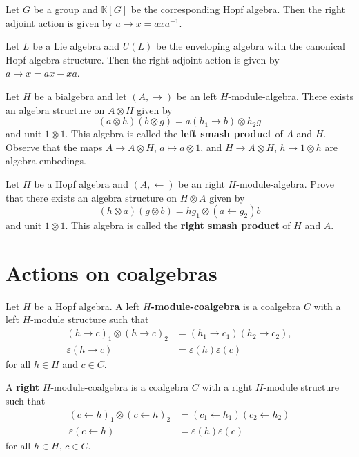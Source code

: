 Let $G$ be a group and $\mathbb{K}[G]$ be the corresponding Hopf algebra. Then
the right adjoint action is given by $a\rightarrow x=axa^{-1}$.

\begin{example}
Let $L$ be a Lie algebra and $U(L)$ be the enveloping algebra with
the canonical Hopf algebra structure. Then the right adjoint action
is given by $a\rightarrow x=ax-xa$.
\end{example}

\begin{exercise}
\label{exercise:left_smash}
Let $H$ be a bialgebra and let $(A,\rightarrow)$ be an left $H$-module-algebra.
There exists an algebra structure on $A\otimes H$ given by
\[
(a\otimes h)(b\otimes g)=a(h_{1}\rightarrow b)\otimes h_{2}g
\]
and unit $1\otimes1$. This algebra is called the \textbf{left smash product}
of $A$ and $H$.  Observe that the maps $A\to A\otimes H$, $a\mapsto a\otimes1$,
and $H\to A\otimes H$, $h\mapsto 1\otimes h$ are algebra embedings.
\end{exercise}

\begin{exercise}
Let $H$ be a Hopf algebra and $(A,\leftarrow)$ be an right $H$-module-algebra.
Prove that there exists an algebra structure on $H\otimes A$ given by 
\[
(h\otimes a)(g\otimes b)=hg_{1}\otimes(a\leftarrow g_{2})b
\]
and unit $1\otimes1$. This algebra is called the \textbf{right
smash product} of $H$ and $A$. 
\end{exercise}

\section{Actions on coalgebras}

\begin{definition}
\label{def:module_coalgebra}
Let $H$ be a Hopf algebra. A left \textbf{$H$-module-coalgebra}
is a coalgebra $C$ with a left $H$-module structure such that 
\begin{align*}
(h\rightarrow c)_{1}\otimes(h\rightarrow c)_{2} & =(h_{1}\rightarrow c_{1})(h_{2}\rightarrow c_{2}),\\
\varepsilon(h\rightarrow c) & =\varepsilon(h)\varepsilon(c)
\end{align*}
for all $h\in H$ and $c\in C$. 
\end{definition}

A \textbf{right} $H$-module-coalgebra is a coalgebra $C$ with a right
$H$-module structure such that 
\begin{align*}
(c\leftarrow h)_{1}\otimes(c\leftarrow h)_{2} & =(c_{1}\leftarrow h_{1})(c_{2}\leftarrow h_{2})\\
\varepsilon(c\leftarrow h) & =\varepsilon(h)\varepsilon(c)
\end{align*}
for all $h\in H$, $c\in C$.

